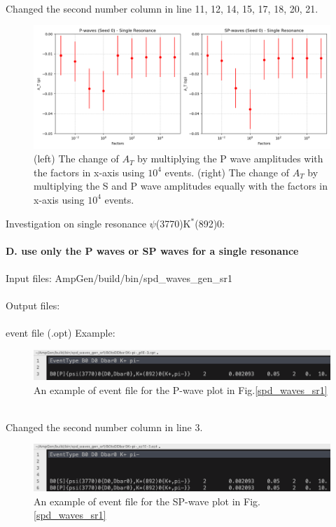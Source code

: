 \\
Changed the second number column in line 11, 12, 14, 15, 17, 18, 20, 21.
\begin{figure}[h]
\center
\includegraphics*[width=0.96\linewidth]{p_wave/spd_waves_sr2}
\caption{(left) The change of $A_T$ by multiplying the P wave amplitudes with the factors in x-axis using $10^4$ events. (right) The change of $A_T$ by multiplying the S and P wave amplitudes equally with the factors in x-axis using $10^4$ events.}
\label{spd_waves_sr2}
\end{figure}
\clearpage
\noindent Investigation on single resonance $\psi$(3770)K$^*$(892)0:
\\
\\
\textbf{D. use only the P waves or SP waves for a single resonance}
\\
\\
\indent Input files: AmpGen/build/bin/spd\_waves\_gen\_sr1 
\\
\\
\indent Output files: 
\\
\\
event file (.opt) Example:
\begin{figure}[h]
\center
\includegraphics*[width=0.96\linewidth]{p_wave/event_info_p_sr1_10000}
\caption{An example of event file for the P-wave plot in Fig.\ref{spd_waves_sr1}}
\label{event_info_p_sr1_10000}
\end{figure}
\\
Changed the second number column in line 3.
\begin{figure}[h]
\center
\includegraphics*[width=0.96\linewidth]{p_wave/event_info_sp_sr1_10000}
\caption{An example of event file for the SP-wave plot in Fig.\ref{spd_waves_sr1}}
\label{event_info_sp_sr1_10000}
\end{figure}
